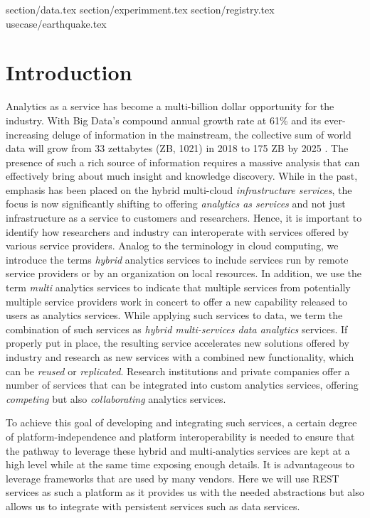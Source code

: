 


section/data.tex
	section/experimment.tex
	section/registry.tex
	usecase/earthquake.tex
\section{Introduction}
\label{sec:summary}


Analytics as a service has become a multi-billion dollar opportunity for the industry. With Big Data's compound annual growth rate at 61\% and its ever-increasing deluge of information in the
mainstream, the collective sum of world data will grow from 33
zettabytes (ZB, 1021) in 2018 to 175 ZB by 2025 \cite{www-idc-forecast}.
The presence of such a rich source
of information requires a massive analysis that can effectively bring
about much insight and knowledge discovery. While in the past, emphasis has been placed on the hybrid multi-cloud {\em infrastructure
services}, the focus is now significantly shifting to offering {\em
analytics as services} and not just infrastructure as a service to
customers and researchers. Hence, it is important to identify how
researchers and industry can interoperate with services offered by
various service providers. Analog to the terminology in cloud
computing, we introduce the terms {\em hybrid} analytics services to
include services run by remote service providers or by an organization
on local resources. In addition, we use the term {\em multi}
analytics services to indicate that multiple services from potentially
multiple service providers work in concert to offer a new capability
released to users as analytics services. While applying such services
to data, we term the combination of such services as {\em hybrid
multi-services data analytics} services. If properly put in place, the
resulting service accelerates new solutions offered by industry and
research as new services with a combined new functionality, which can
be {\em reused} or {\em replicated}. Research institutions and private
companies offer a number of services that can be integrated into
custom analytics services, offering {\em competing} but also {\em
collaborating} analytics services.

To achieve this goal of developing and integrating such services, a certain degree of platform-independence and
platform interoperability is needed to ensure that the pathway to
leverage these hybrid and multi-analytics services are kept at a high
level while at the same time exposing enough details. 
It is advantageous to leverage frameworks that are used by many vendors. Here
we will use REST services as such a platform as it provides us with
the needed abstractions but also allows us to integrate with persistent services such as data services.

